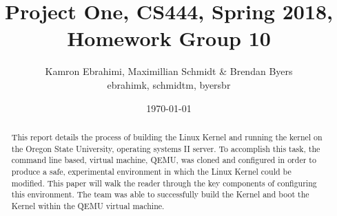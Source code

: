 \documentclass[10pt,onecolumn,draftclsnofoot]{IEEEtran} %
\title{ Project One, CS444, Spring 2018, Homework Group 10}
\author{Kamron Ebrahimi, Maximillian Schmidt \& Brendan Byers \\ ebrahimk, schmidtm, byersbr }
\date{\today}
\begin{document}
\begin{titlingpage}
\maketitle
\begin{abstract}
\begin{singlespace}
This report details the process of building the Linux Kernel and running the kernel on the Oregon State University, operating systems II server. To accomplish this task, the command line based, virtual machine, QEMU, was cloned and configured in order to produce a safe, experimental environment in which the Linux Kernel could be modified. This paper will walk the reader through the key components of configuring this environment. The team was able to successfully build the Kernel and boot the Kernel within the QEMU virtual machine.     %
\end{singlespace}
\end{abstract}
\end{titlingpage}


\tableofcontents
\end{document}
